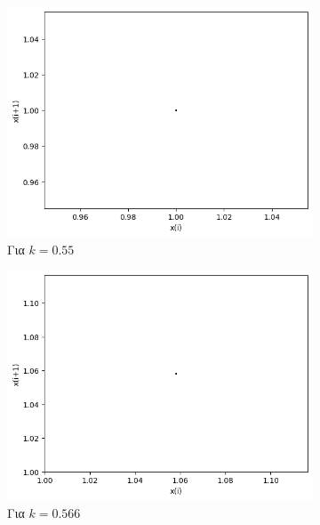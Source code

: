 \begin{figure}[ht]
	\centering
	
	\begin{subfigure}[b]{0.4\textwidth}
		\centering
		\includegraphics[width=\textwidth]{LateX images/graphs q12/g3}
		\caption{Για $k=0.55$}
		\label{f:k59}
	\end{subfigure}
	\hfill
	\begin{subfigure}[b]{0.4\textwidth}
		\centering
		\includegraphics[width=\textwidth]{LateX images/graphs q12/g4}
		\caption{Για $k=0.566$}
		\label{f:k60}
	\end{subfigure}
	\hfill
	\begin{subfigure}[b]{0.4\textwidth}
		\centering

\end{subfigure}
\end{figure}
